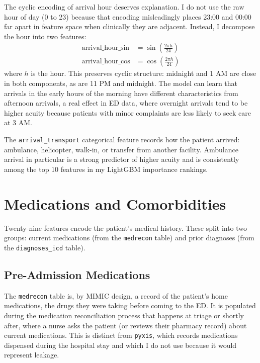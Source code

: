 The cyclic encoding of arrival hour deserves explanation. I do not use the raw hour of day (0 to 23) because that encoding misleadingly places 23:00 and 00:00 far apart in feature space when clinically they are adjacent. Instead, I decompose the hour into two features:
\begin{align*}
\text{arrival\_hour\_sin} &= \sin\!\left(\frac{2\pi h}{24}\right) \\
\text{arrival\_hour\_cos} &= \cos\!\left(\frac{2\pi h}{24}\right)
\end{align*}
where $h$ is the hour. This preserves cyclic structure: midnight and 1 AM are close in both components, as are 11 PM and midnight. The model can learn that arrivals in the early hours of the morning have different characteristics from afternoon arrivals, a real effect in ED data, where overnight arrivals tend to be higher acuity because patients with minor complaints are less likely to seek care at 3 AM.

The \texttt{arrival\_transport} categorical feature records how the patient arrived: ambulance, helicopter, walk-in, or transfer from another facility. Ambulance arrival in particular is a strong predictor of higher acuity and is consistently among the top 10 features in my LightGBM importance rankings.

\section{Medications and Comorbidities}

Twenty-nine features encode the patient's medical history. These split into two groups: current medications (from the \texttt{medrecon} table) and prior diagnoses (from the \texttt{diagnoses\_icd} table).

\subsection*{Pre-Admission Medications}

The \texttt{medrecon} table is, by MIMIC design, a record of the patient's home medications, the drugs they were taking before coming to the ED. It is populated during the medication reconciliation process that happens at triage or shortly after, where a nurse asks the patient (or reviews their pharmacy record) about current medications. This is distinct from \texttt{pyxis}, which records medications dispensed during the hospital stay and which I do not use because it would represent leakage.

